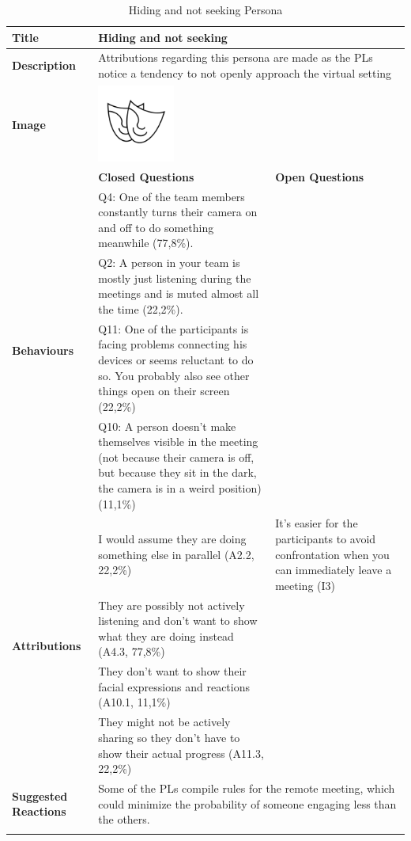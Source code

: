 \begin{longtable}[ht]{ p{}  p{} p{} }
\caption{Hiding and not seeking Persona}
\label{tab:hiding}\\
\hline
\textbf{Title} & Hiding and not seeking \\
    \hline
   \textbf{Description} &  \multicolumn{2}{p{.80\textwidth}}{Attributions regarding this persona are made as the PLs notice a tendency to not openly approach the virtual setting} \\
   \hline
   \textbf{Image} &  \includegraphics[valign=t, width=1in, margin=0pt 3pt 0pt 3pt]{figures/Mask.png} \\
   \hline
    & \textbf{Closed Questions} & \textbf{Open Questions} \\
    \hline
    \multirow{4}{4cm}{\textbf{Behaviours}}  & Q4: One of the team members constantly turns their camera on and off to do something meanwhile (77,8\%). \\
     & Q2: A person in your team is mostly just listening during the meetings and is muted almost all the time (22,2\%). \\
 	 & Q11: One of the participants is facing problems connecting his devices or seems reluctant to do so. You probably also see other things open on their screen (22,2\%)  \\
 	 & Q10: A person doesn’t make themselves visible in the meeting (not because their camera is off, but because they sit in the dark, the camera is in a weird position) (11,1\%) \\
    \hline
    \multirow{4}{4cm}{\textbf{Attributions}}  & I would assume they are doing something else in parallel (A2.2, 22,2\%) & It's easier for the participants to avoid confrontation when you can immediately leave a meeting (I3) \\
     & They are possibly not actively listening and don’t want to show what they are doing instead  (A4.3, 77,8\%) \\
     & They don’t want to show their facial expressions and reactions (A10.1, 11,1\%) \\
     & They might not be actively sharing so they don't have to show their actual progress (A11.3, 22,2\%)\\
    \hline 
     \textbf{Suggested Reactions} & \multicolumn{2}{p{.80\textwidth}}{Some of the PLs compile rules for the remote meeting, which could minimize the probability of someone engaging less than the others.} \\
    \hline
\label{tab:multicol}
\end{longtable}

